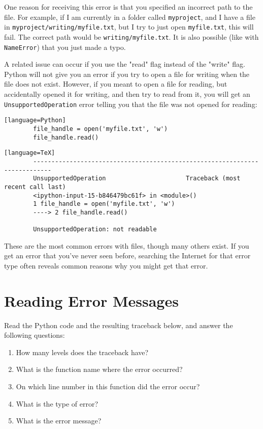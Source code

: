 \documentclass{article}
\begin{document}
	One reason for receiving this error is that you specified an incorrect path to the file. For example, if I am currently in a folder called \texttt{myproject}, and I have a file in \texttt{myproject/writing/myfile.txt}, but I try to just open \texttt{myfile.txt}, this will fail. The correct path would be \texttt{writing/myfile.txt}. It is also possible (like with \texttt{NameError}) that you just made a typo.
	
	A related issue can occur if you use the "read" flag instead of the "write" flag. Python will not give you an error if you try to open a file for writing when the file does not exist. However, if you meant to open a file for reading, but accidentally opened it for writing, and then try to read from it, you will get an \texttt{UnsupportedOperation} error telling you that the file was not opened for reading:
	
	\begin{verbatim}[language=Python]
		file_handle = open('myfile.txt', 'w')
		file_handle.read()
	\end{verbatim}
	
	\begin{verbatim}[language=TeX]
		---------------------------------------------------------------------------
		UnsupportedOperation                      Traceback (most recent call last)
		<ipython-input-15-b846479bc61f> in <module>()
		1 file_handle = open('myfile.txt', 'w')
		----> 2 file_handle.read()
		
		UnsupportedOperation: not readable
	\end{verbatim}
	
	These are the most common errors with files, though many others exist. If you get an error that you've never seen before, searching the Internet for that error type often reveals common reasons why you might get that error.
	
	\section{Reading Error Messages}
	
	Read the Python code and the resulting traceback below, and answer the following questions:
	
	\begin{enumerate}
		\item How many levels does the traceback have?
		\item What is the function name where the error occurred?
		\item On which line number in this function did the error occur?
		\item What is the type of error?
		\item What is the error message?
	\end{enumerate}
	
\end{document}
